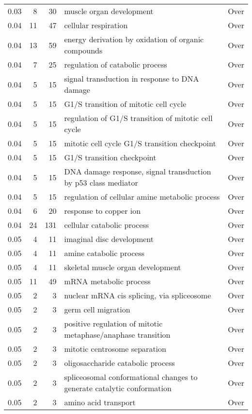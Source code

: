 \documentclass[10pt]{bmc_article}
\newenvironment{bmcformat}{\begin{raggedright}\baselineskip20pt\sloppy\setboolean{publ}{false}}{\end{raggedright}\baselineskip20pt\sloppy}
\begin{document}
\begin{bmcformat}
\begin{longtable}{rrrp{4cm}r}
  0.03 &   8 &  30 & muscle organ development & Over \\ 
  0.04 &  11 &  47 & cellular respiration & Over \\ 
  0.04 &  13 &  59 & energy derivation by oxidation of organic compounds & Over \\ 
  0.04 &   7 &  25 & regulation of catabolic process & Over \\ 
  0.04 &   5 &  15 & signal transduction in response to DNA damage & Over \\ 
  0.04 &   5 &  15 & G1/S transition of mitotic cell cycle & Over \\ 
  0.04 &   5 &  15 & regulation of G1/S transition of mitotic cell cycle & Over \\ 
  0.04 &   5 &  15 & mitotic cell cycle G1/S transition checkpoint & Over \\ 
  0.04 &   5 &  15 & G1/S transition checkpoint & Over \\ 
  0.04 &   5 &  15 & DNA damage response, signal transduction by p53 class mediator & Over \\ 
  0.04 &   5 &  15 & regulation of cellular amine metabolic process & Over \\ 
  0.04 &   6 &  20 & response to copper ion & Over \\ 
  0.04 &  24 & 131 & cellular catabolic process & Over \\ 
  0.05 &   4 &  11 & imaginal disc development & Over \\ 
  0.05 &   4 &  11 & amine catabolic process & Over \\ 
  0.05 &   4 &  11 & skeletal muscle organ development & Over \\ 
  0.05 &  11 &  49 & mRNA metabolic process & Over \\ 
  0.05 &   2 &   3 & nuclear mRNA cis splicing, via spliceosome & Over \\ 
  0.05 &   2 &   3 & germ cell migration & Over \\ 
  0.05 &   2 &   3 & positive regulation of mitotic metaphase/anaphase transition & Over \\ 
  0.05 &   2 &   3 & mitotic centrosome separation & Over \\ 
  0.05 &   2 &   3 & oligosaccharide catabolic process & Over \\ 
  0.05 &   2 &   3 & spliceosomal conformational changes to generate catalytic conformation & Over \\ 
  0.05 &   2 &   3 & amino acid transport & Over \\ 

\end{longtable}
\end{bmcformat}
\end{document}
